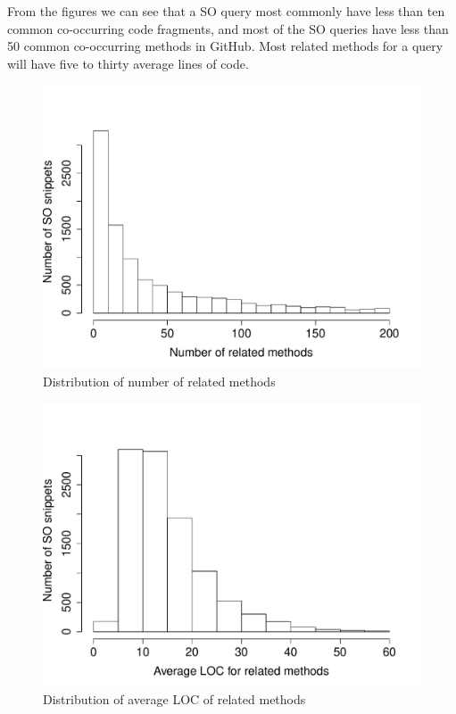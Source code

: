 From the figures we can see that a SO query most commonly have less than ten common co-occurring code fragments, and most of the SO queries have less than 50 common co-occurring methods in GitHub. Most related methods for a query will have five to thirty average lines of code.

\begin{figure}
	\includegraphics[scale=0.4]{figures/dist-related.pdf}
	\caption{Distribution of number of related methods}
	\label{fig:num-related}
\end{figure}

\begin{figure}
	\includegraphics[scale=0.4]{figures/dist-loc.pdf}
	\caption{Distribution of average LOC of related methods}
	\label{fig:avg-loc}
\end{figure}

